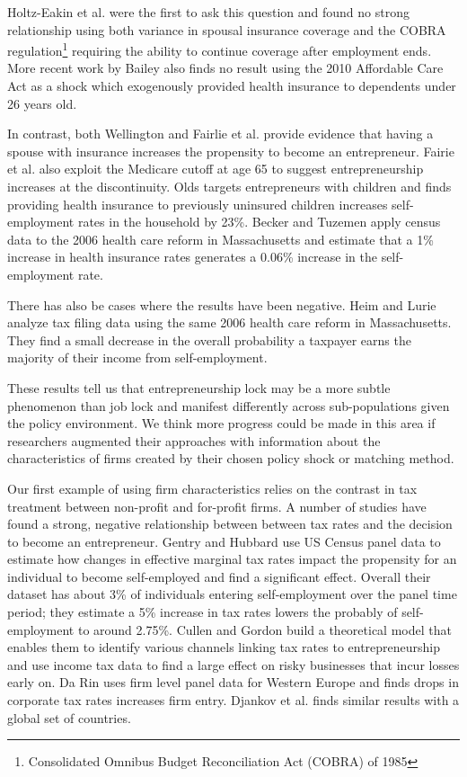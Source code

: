 \documentclass[12pt]{article}
\begin{document}
Holtz-Eakin et al. \cite{holtz_health} were the first to ask this question and found no strong relationship using both variance in spousal insurance coverage and the COBRA regulation\footnote{Consolidated Omnibus Budget Reconciliation Act (COBRA) of 1985} requiring the ability to continue coverage after employment ends. More recent work by Bailey \cite{bailey} also finds no result using the 2010 Affordable Care Act as a shock which exogenously provided health insurance to dependents under 26 years old. 

In contrast, both Wellington \cite{wellington} and Fairlie et al. \cite{fairlie_health} provide evidence that having a spouse with insurance increases the propensity to become an entrepreneur. Fairie et al. \cite{fairlie_health} also exploit the Medicare cutoff at age 65 to suggest entrepreneurship increases at the discontinuity. Olds \cite{olds} targets entrepreneurs with children and finds providing health insurance to previously uninsured children increases self-employment rates in the household by 23\%.  Becker and Tuzemen \cite{tuzemen} apply census data to the 2006 health care reform in Massachusetts and estimate that a 1\% increase in health insurance rates generates a 0.06\% increase in the self-employment rate. 

There has also be cases where the results have been negative. Heim and Lurie \cite{heimLurie} analyze tax filing data using the same 2006 health care reform in Massachusetts. They find a small decrease in the overall probability a taxpayer earns the majority of their income from self-employment.

These results tell us that entrepreneurship lock may be a more subtle phenomenon than job lock and manifest differently across sub-populations given the policy environment. We think more progress could be made in this area if researchers augmented their approaches with information about the characteristics of firms created by their chosen policy shock or matching method. 

Our first example of using firm characteristics relies on the contrast in tax treatment between non-profit and for-profit firms. A number of studies have found a strong, negative relationship between between tax rates and the decision to become an entrepreneur. Gentry and Hubbard \cite{gentry} use US Census panel data to estimate how changes in effective marginal tax rates impact the propensity for an individual to become self-employed and find a significant effect. Overall their dataset has about 3\% of individuals entering self-employment over the panel time period; they estimate a 5\% increase in tax rates lowers the probably of self-employment to around 2.75\%. Cullen and Gordon \cite{cullen} build a theoretical model that enables them to identify various channels linking tax rates to entrepreneurship and use income tax data to find a large effect on risky businesses that incur losses early on. Da Rin \cite{darin} uses firm level panel data for Western Europe and finds drops in corporate tax rates increases firm entry. Djankov et al. \cite{djankov} finds similar results with a global set of countries. 
\end{document}
